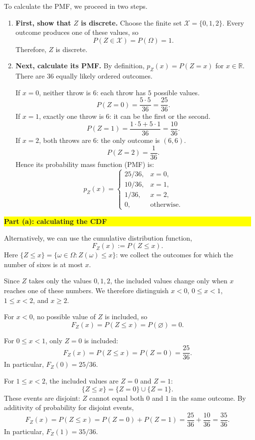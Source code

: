 \documentclass[a4paper,12pt,oneside]{report}
\newcommand{\solutionheading}[1]{%
  \par\Needspace{5\baselineskip}\noindent
  \begingroup\setlength{\fboxsep}{1pt}%
  \colorbox{yellow}{\strut\textbf{#1}}\endgroup\par\nobreak}
\begin{document}
To calculate the PMF, we proceed in two steps.
\begin{enumerate}
  \item \textbf{First, show that $Z$ is discrete.}
    Choose the finite set $\mathcal X=\{0,1,2\}$. Every outcome
    produces one of these values, so
    \[
      P(Z\in\mathcal X)=P(\Omega)=1.
    \]
    Therefore, $Z$ is discrete.
  \item \textbf{Next, calculate its PMF.}
    By definition, $p_Z(x)=P(Z=x)$ for $x\in\mathbb R$.
    There are $36$ equally likely ordered outcomes.

    If $x=0$, neither throw is $6$: each throw has $5$ possible values.
    \[
      P(Z=0)=\frac{5\cdot5}{36}=\frac{25}{36}.
    \]
    If $x=1$, exactly one throw is $6$: it can be the first or the second.
    \[
      P(Z=1)=\frac{1\cdot5+5\cdot1}{36}=\frac{10}{36}.
    \]
    If $x=2$, both throws are $6$: the only outcome is $(6,6)$.
    \[
      P(Z=2)=\frac{1}{36}.
    \]
    Hence its probability mass function (PMF) is:
    \[
      p_Z(x)=
      \begin{cases}
        25/36, & x=0,\\
        10/36, & x=1,\\
        1/36, & x=2,\\
        0, & \text{otherwise}.
      \end{cases}
    \]
\end{enumerate}

\solutionheading{Part (a): calculating the CDF}
Alternatively, we can use the cumulative distribution function,
\[
  F_Z(x):=P(Z\leq x).
\]
Here $\{Z\leq x\}=\{\omega\in\Omega:Z(\omega)\leq x\}$:
we collect the outcomes for which the number of sixes is at most $x$.

Since $Z$ takes only the values $0,1,2$, the included values change
only when $x$ reaches one of these numbers. We therefore distinguish
$x<0$, $0\leq x<1$, $1\leq x<2$, and $x\geq2$.

For $x<0$, no possible value of $Z$ is included, so
\[
  F_Z(x)=P(Z\leq x)=P(\varnothing)=0.
\]

For $0\leq x<1$, only $Z=0$ is included:
\[
  F_Z(x)=P(Z\leq x)=P(Z=0)=\frac{25}{36}.
\]
In particular, $F_Z(0)=25/36$.

For $1\leq x<2$, the included values are $Z=0$ and $Z=1$:
\[
  \{Z\leq x\}=\{Z=0\}\cup\{Z=1\}.
\]
These events are disjoint: $Z$ cannot equal both $0$ and $1$ in the
same outcome. By additivity of probability for disjoint events,
\[
  F_Z(x)=P(Z\leq x)=P(Z=0)+P(Z=1)
  =\frac{25}{36}+\frac{10}{36}=\frac{35}{36}.
\]
In particular, $F_Z(1)=35/36$.
\end{document}
